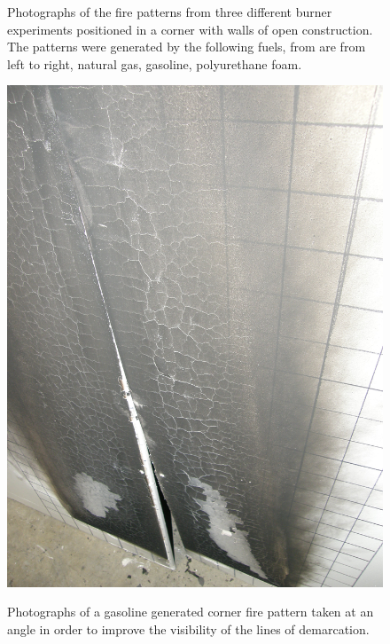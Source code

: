 \documentclass[twoside]{uocthesis}
\begin{document}
{\begin{figure}[p]
	\caption[Photographs of the fire patterns from three different burner experiments positioned in a corner]{Photographs of the fire patterns from three different burner experiments positioned in a corner with walls of open construction.  The patterns were generated by the following fuels, from are from left to right, natural gas, gasoline, polyurethane foam.}
	\label{PT_Corners}
\end{figure}

\begin{figure}[h]
	\includegraphics[width=5in]{../Figures/C_PTGASClose} \\
	
	\caption[Photographs of a gasoline generated corner fire pattern taken at an angle]{Photographs of a gasoline generated corner fire pattern taken at an angle in order to improve the visibility of the lines of demarcation.}
	\label{C_PTGASClose}
\end{figure}

}
\end{document}
